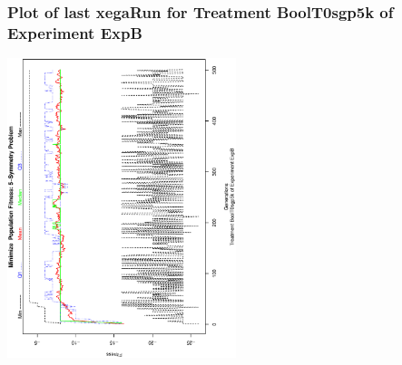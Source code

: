  \begin{frame}
 \frametitle{ Plot of last xegaRun for Treatment BoolT0sgp5k of Experiment ExpB }
 \begin{center}
\includegraphics[width=0.5\textwidth, angle=-90]
{ExpBPlotPopStatsFigure003.eps}
 \end{center}
 \label{report/ExpBPlotPopStatsFigure003.eps}  
 \end{frame}

